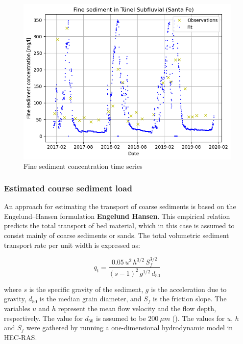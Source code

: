 \begin{figure}[H]
    \centering
    \includegraphics[width=0.5\linewidth]{figures/ch6/fine sediment concentrations.png}
    \caption{Fine sediment concentration time series}
    \label{fig:timeseries fine sediments}
\end{figure}



\subsubsection{Estimated course sediment load}
An approach for estimating the transport of coarse sediments is based on the Engelund–Hansen formulation \textbf{Engelund Hansen}. This empirical relation predicts the total transport of bed material, which in this case is assumed to consist mainly of coarse sediments or sands. The total volumetric sediment transport rate per unit width is expressed as:

\begin{equation}
    q_{t} = \frac{0.05\,u^{2}\,h^{3/2}\,S_{f}^{3/2}}{(s - 1)^{2}\,g^{1/2}\,d_{50}}
    \label{eq:engelund_hansen}
\end{equation}

where \( s \) is the specific gravity of the sediment, \( g \) is the acceleration due to gravity, \( d_{50} \) is the median grain diameter, and \( S_{f} \) is the friction slope. The variables \( u \) and \( h \) represent the mean flow velocity and the flow depth, respectively. The value for $d_{50}$ is assumed to be $200 ~\mu m$ (\cite{reMetodologiaParaGeneracion2009}). The values for $u$, $h$ and $S_f$ were gathered by running a one-dimensional hydrodynamic model in HEC-RAS. 







